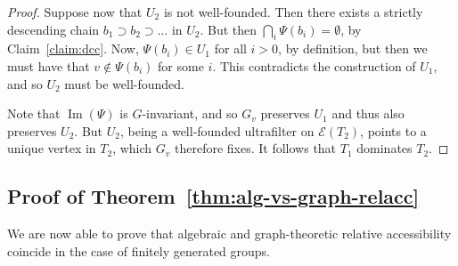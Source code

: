 \documentclass[11pt,a4paper]{amsart}
\theoremstyle{definition}
\begin{document}
\begin{proof}
    Suppose now that $U_2$ is not well-founded. Then there exists a strictly descending chain $b_1 \supset b_2 \supset \ldots$ in $U_2$. But then $\bigcap_i \Psi(b_i) = \emptyset$, by Claim~\ref{claim:dcc}. Now, $\Psi(b_i) \in U_1$ for all $i> 0$, by definition, but then we must have that $v \not\in \Psi(b_i)$ for some $i$. This contradicts the construction of $U_1$, and so $U_2$ must be well-founded. 
    
    Note that $\operatorname{Im}(\Psi)$ is $G$-invariant, and so $G_v$ preserves $U_1$ and thus also preserves $U_2$. But $U_2$, being a well-founded ultrafilter on $\mathscr E(T_2)$, points to a unique vertex in $T_2$, which $G_v$ therefore fixes. It follows that $T_1$ dominates $T_2$. 
\end{proof}

\subsection{Proof of Theorem~\ref{thm:alg-vs-graph-relacc}} We are now able to prove that algebraic and graph-theoretic relative accessibility coincide in the case of finitely generated groups.

\algaccchar*
\end{document}

